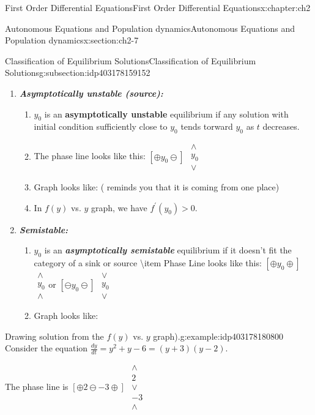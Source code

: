 \documentclass[oneside,10pt,]{book}
\newcommand{\alert}[1]{\textbf{\textit{#1}}}
\newcommand{\terminology}[1]{\textbf{#1}}
\numberwithin{equation}{section}
\numberwithin{equation}{section}
\begin{document}
\begin{chapterptx}{First Order Differential Equations}{}{First Order Differential Equations}{}{}{x:chapter:ch2}
\begin{sectionptx}{Autonomous Equations and Population dynamics}{}{Autonomous Equations and Population dynamics}{}{}{x:section:ch2-7}
\begin{subsectionptx}{Classification of Equilibrium Solutions}{}{Classification of Equilibrium Solutions}{}{}{g:subsection:idp403178159152}
\begin{enumerate}
\item{}\alert{Asymptotically unstable (source):}%
%
\begin{enumerate}
\item{}\(y_{0}\) is an \terminology{asymptotically unstable} equilibrium if any solution with initial condition sufficiently close to \(y_{0}\) tends torward \(y_{0}\) as \(t\) decreases.%
\item{}The phase line looks like this: \(\left[\oplus y_{0}\ominus\right]\) \(\begin{array}{c}
\wedge\\
y_{0}\\
\vee
\end{array}\)%
\item{}Graph looks like: ( reminds you that it is coming from one place)%
\item{}In \(f(y)\) vs. \(y\) graph, we have \(f^{\prime}(y_{0})>0\).%
\end{enumerate}
\item{}\alert{Semistable:}%
%
\begin{enumerate}
\item{}\(y_{0}\) is an \alert{asymptotically semistable} equilibrium if it doesn't fit the category of a sink or source \textbackslash{}item Phase Line looks like this: \(\left[\oplus y_{0}\oplus\right]\) \(\begin{array}{c}
\wedge\\
y_{0}\\
\wedge
\end{array}\)or \(\left[\ominus y_{0}\ominus\right]\) \(\begin{array}{c}
\vee\\
y_{0}\\
\vee
\end{array}\)%
\item{}Graph looks like:%
\end{enumerate}
\end{enumerate}
\begin{example}{Drawing solution from the \(f(y)\) vs. \(y\) graph).}{g:example:idp403178180800}%
Consider the equation \(\frac{dy}{dt}=y^{2}+y-6=(y+3)(y-2)\).%
\par
The phase line is \(\left[\oplus2\ominus-3\oplus\right]\) \(\begin{array}{c}
\wedge\\
2\\
\vee\\
-3\\
\wedge
\end{array}\)%

\end{example}
\end{subsectionptx}
\end{sectionptx}
\end{chapterptx}
\end{document}
